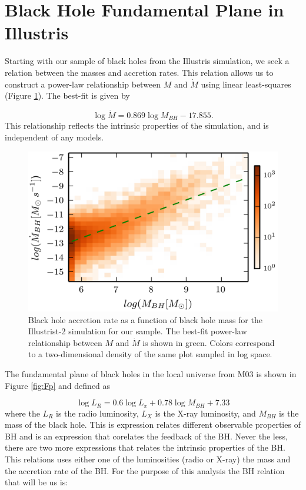 \section{Black Hole Fundamental Plane in Illustris}

\label{sec:analysis}Starting with our sample of black holes from
the Illustris simulation, we seek a relation between the masses and
accretion rates. This relation allows us to construct a power-law
relationship between $M$ and $\dot{M}$ using linear least-squares
(Figure \ref{fig:bhpop_hist2d}). The best-fit is given by

\begin{equation}
\log\dot{M}=0.869\log M_{BH}-17.855.\label{eq:int_relation}
\end{equation}
This relationship reflects the intrinsic properties of the simulation,
and is independent of any models.
\begin{figure}
\centering{}\includegraphics[clip]{Figures/Illustris2_bhpop_hist2d}
\protect\caption{\label{fig:bhpop_hist2d}Black hole accretion rate as a function of
black hole mass for the Illustrist-2 simulation for our sample. The
best-fit power-law relationship between $M$ and $\dot{M}$ is shown
in green. Colors correspond to a two-dimensional density of the same
plot sampled in log space.}
\end{figure}

The fundamental plane of black holes in the local universe from M03
is shown in Figure \ref{fig:Fp} and defined as

\begin{equation}
\log L_{R}=0.6\log L_{x}+0.78\log M_{BH}+7.33
\end{equation}
where the $L_{R}$ is the radio luminosity, $L_{X}$ is the X-ray
luminosity, and $M_{BH}$ is the mass of the black hole. This is expression relates different observable properties of BH and is an expression that corelates the feedback of the BH.  Never the less,  there are two more expressions that relates the intrinsic properties of the BH. This relations uses either one of the luminosities  (radio or X-ray) the mass and the accretion rate of the BH.  For the purpose of this analysis the BH relation that will be us is:

